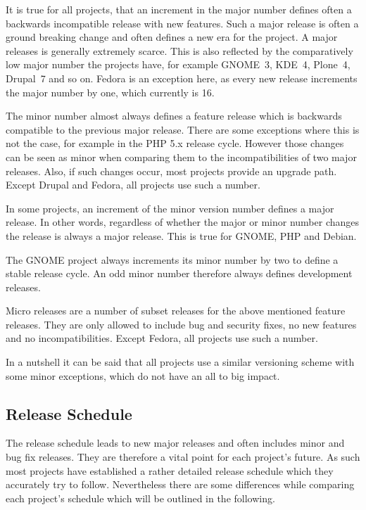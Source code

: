 It is true for all projects, that an increment in the major number defines
often a backwards incompatible release with new features. Such a major release
is often a ground breaking change and often defines a new era for the project.
A major releases is generally extremely scarce. This is also reflected by the
comparatively low major number the projects have, for example GNOME~3, KDE~4,
Plone~4, Drupal~7 and so on. Fedora is an exception here, as every new release
increments the major number by one, which currently is 16.

The minor number almost always defines a feature release which is backwards
compatible to the previous major release. There are some exceptions where this
is not the case, for example in the PHP 5.x release cycle. However those
changes can be seen as minor when comparing them to the incompatibilities of
two major releases. Also, if such changes occur, most projects provide an
upgrade path. Except Drupal and Fedora, all projects use such a number.

In some projects, an increment of the minor version number defines a major
release. In other words, regardless of whether the major or minor number
changes the release is always a major release. This is true for GNOME, PHP and
Debian.

The GNOME project always increments its minor number by two to define a stable
release cycle. An odd minor number therefore always defines development
releases.

Micro releases are a number of subset releases for the above mentioned feature
releases. They are only allowed to include bug and security fixes, no new
features and no incompatibilities. Except Fedora, all projects use such a
number.

In a nutshell it can be said that all projects use a similar versioning scheme
with some minor exceptions, which do not have an all to big impact.


\subsection{Release Schedule} %

The release schedule leads to new major releases and often includes minor and
bug fix releases. They are therefore a vital point for each project's future. As
such most projects have established a rather detailed release schedule which
they accurately try to follow. Nevertheless there are some differences while
comparing each project's schedule which will be outlined in the following.

